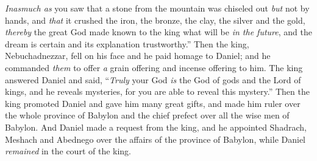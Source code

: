 \begin{biblechapter}
\verse \textit{Inasmuch as} you saw that a stone from the mountain was chiseled out \textit{but} not by hands, and \textit{that} it crushed the iron, the bronze, the clay, the silver and the gold, \textit{thereby} the great God made known to the king what will be \textit{in the future}, and the dream is certain and its explanation trustworthy.”
 Then the king, Nebuchadnezzar, fell on his face and he paid homage to Daniel; and he commanded \textit{them} to offer \textit{a} grain offering and incense offering to him.
\verse The king answered Daniel and said, “\textit{Truly} your God \textit{is} the God of gods and the Lord of kings, and he reveals mysteries, for you are able to reveal this mystery.”
\verse Then the king promoted Daniel and gave him many great gifts, and made him ruler over the whole province of Babylon and the chief prefect over all the wise men of Babylon.
\verse And Daniel made a request from the king, and he appointed Shadrach, Meshach and Abednego over the affairs of the province of Babylon, while Daniel \textit{remained} in the court of the king.
\end{biblechapter}

